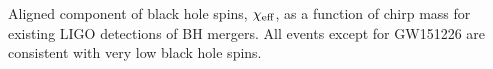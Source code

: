 \label{BHspin} Aligned component of black hole spins, $\chi_{\rm eff}$, as a function of chirp mass for existing LIGO detections of BH mergers. All events except for GW151226 are consistent with very low black hole spins.
